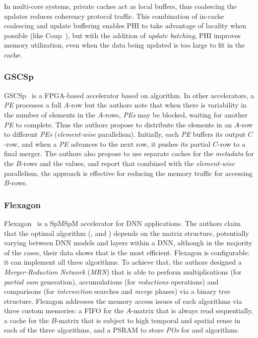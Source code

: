 In multi-core systems, private caches act as local buffers, thus coalescing the updates reduces coherency protocol traffic. This combination of in-cache coalescing and update buffering enables PHI to take advantage of locality when possible (like Coup~\cite{ZHANG_2015__Exploiting_Commutativity}), but with the addition of \emph{update batching}, PHI improves memory utilization, even when the data being updated is too large to fit in the cache.

\subsubsection{GSCSp}

GSCSp~\cite{LI_2023_GSCSp} is a FPGA-based accelerator based on  algorithm. In other  accelerators, a \emph{PE} processes a full $A$-row but the authors note that when there is variability in the number of elements in the $A$-rows, \emph{PEs} may be blocked, waiting for another \emph{PE} to complete. Thus the authors propose to distribute the elements in an $A$-row to different \emph{PEs} (\emph{element-wise} parallelism). Initially, each \emph{PE} buffers its output $C$-row, and when a \emph{PE} advances to the next row, it pushes its partial $C$-row to a final merger. The authors also propose to use separate caches for the \emph{metadata} for the $B$-rows and the values, and report that combined with the \emph{element-wise} parallelism, the approach is effective for reducing the memory traffic for accessing $B$-rows.

\subsubsection{Flexagon}

Flexagon~\cite{Munoz-Martinez2023_Flexagon} is a SpMSpM accelerator for DNN applications. The authors claim that the optimal algorithm (,  and ) depends on the matrix structure, potentially varying between DNN models and layers within a DNN, although in the majority of the cases, their data shows that  is the most efficient. Flexagon is configurable: it can implement all three  algorithms. To achieve that, the authors designed a \emph{Merger-Reduction Network} (\emph{MRN}) that is able to perform multiplications (for \emph{partial sum} generation), accumulations (for \emph{reductions} operations) and comparisons (for \emph{intersection} searches and \emph{merge} phases) via a binary tree structure. Flexagon addresses the memory access issues of each algorithms via three custom memories: a FIFO for the $A$-matrix that is always read sequentially, a cache for the $B$-matrix that is subject to high temporal and spatial reuse in each of the three algorithms, and a PSRAM to store \emph{POs} for  and  algorithms.

